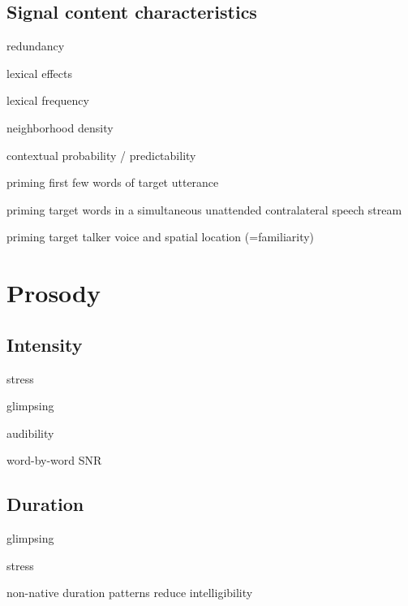 \subsection{Signal content characteristics}
\begin{itm}
	\item{redundancy}
	\item{lexical effects \citep{HoenEtAl2007, BoulengerEtAl2010, BrouwerEtAl2012}}
	\item{lexical frequency}
	\item{neighborhood density}
	\item{contextual probability / predictability}
	\item{priming first few words of target utterance \citep{FreymanEtAl2004}}
	\item{priming target words in a simultaneous unattended contralateral speech stream \citep{RivenezEtAl2006}}
	\item{priming target talker voice and spatial location (=familiarity) \citep{KiddEtAl2005a, KitterickEtAl2010}}
\end{itm}





\section{Prosody}

\subsection{Intensity}
\begin{itm}
	\item{stress}
	\item{glimpsing}
	\item{audibility}
	\item{word-by-word SNR}
\end{itm}

\subsection{Duration}
\begin{itm}
	\item{glimpsing}
	\item{stress}
	\item{non-native duration patterns reduce intelligibility\citep{QueneVanDelft2010}}
\end{itm}

